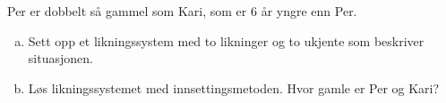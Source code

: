 %
Per er dobbelt så gammel som Kari, som er 6 år yngre enn Per.
\begin{enumerate}[a)]
    \item Sett opp et likningssystem med to likninger og to ukjente som beskriver situasjonen.
    \item Løs likningssystemet med innsettingsmetoden. Hvor gamle er Per og Kari?
\end{enumerate}

